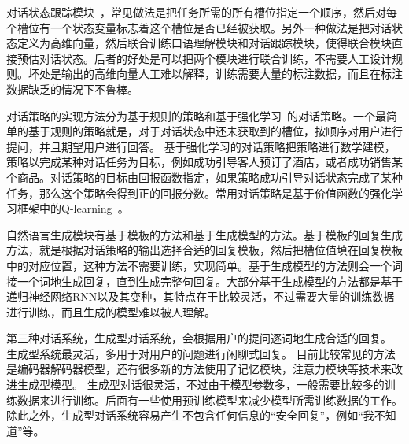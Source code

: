 对话状态跟踪模块~\cite{young2007hidden,henderson2014robust,henderson2014word}，常见做法是把任务所需的所有槽位指定一个顺序，然后对每个槽位有一个状态变量标志着这个槽位是否已经被获取。另外一种做法是把对话状态定义为高维向量，然后联合训练口语理解模块和对话跟踪模块，使得联合模块直接预估对话状态。后者的好处是可以把两个模块进行联合训练，不需要人工设计规则。坏处是输出的高维向量人工难以解释，训练需要大量的标注数据，而且在标注数据缺乏的情况下不鲁棒。 

对话策略的实现方法分为基于规则的策略和基于强化学习~\cite{sutton1998reinforcement}的对话策略。一个最简单的基于规则的策略就是，对于对话状态中还未获取到的槽位，按顺序对用户进行提问，并且期望用户进行回答。
基于强化学习的对话策略把策略进行数学建模，策略以完成某种对话任务为目标，例如成功引导客人预订了酒店，或者成功销售某个商品。对话策略的目标由回报函数指定，如果策略成功引导对话状态完成了某种任务，那么这个策略会得到正的回报分数。常用对话策略是基于价值函数的强化学习框架中的Q-learning~\cite{watkins1989learning}。

自然语言生成模块有基于模板的方法和基于生成模型的方法。基于模板的回复生成方法，就是根据对话策略的输出选择合适的回复模板，然后把槽位值填在回复模板中的对应位置，这种方法不需要训练，实现简单。基于生成模型\cite{wen2015stochastic,wen2015semantically}的方法则会一个词接一个词地生成回复，直到生成完整句回复。大部分基于生成模型的方法都是基于递归神经网络RNN以及其变种，其特点在于比较灵活，不过需要大量的训练数据进行训练，而且生成的模型难以被人理解。

第三种对话系统，生成型对话系统\citep{sutskever2014sequence,shang2015neural,serban2016building,serban2016hierarchical}，会根据用户的提问逐词地生成合适的回复。
生成型系统最灵活，多用于对用户的问题进行闲聊式回复。
目前比较常见的方法是编码器解码器模型，还有很多新的方法使用了记忆模块，注意力模块等技术来改进生成型模型。
生成型对话很灵活，不过由于模型参数多，一般需要比较多的训练数据来进行训练。后面有一些使用预训练模型来减少模型所需训练数据的工作。除此之外，生成型对话系统容易产生不包含任何信息的``安全回复''，例如``我不知道''等。